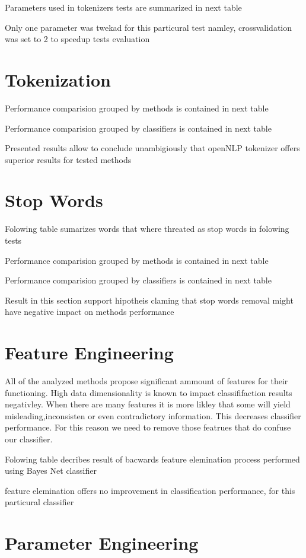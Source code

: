 Parameters used in tokenizers tests are summarized in next table



Only one parameter was twekad for this particural test namley, crossvalidation was set to 2
to speedup tests evaluation
\pagebreak
\section{Tokenization}

Performance comparision grouped by methods is contained in next table


\pagebreak
Performance comparision grouped by classifiers is contained in next table



Presented results allow to conclude unambigiously that openNLP tokenizer offers superior results for tested methods 
\pagebreak
\section{Stop Words}

Folowing table sumarizes words that where threated as stop words in folowing tests



Performance comparision grouped by methods is contained in next table



Performance comparision grouped by classifiers is contained in next table



Result in this section support hipotheis claming that stop words removal might have negative impact on methods performance
\pagebreak
\section{Feature Engineering}

All of the analyzed methods propose significant ammount of features for their functioning. High data dimensionality is known to 
impact classififaction results negativley. When there are many features it is more likley that some will yield misleading,inconsisten or even contradictory
information. This decreases classifier performance. For this reason we need to remove those featrues that do confuse our classifier. 

 

Folowing table decribes result of bacwards feature elemination process performed using Bayes Net classifier

feature elemination offers no improvement in classification performance, for this particural classifier






\pagebreak
\section{Parameter Engineering}